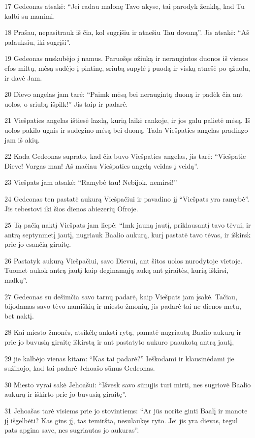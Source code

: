 \par 17 Gedeonas atsakė: “Jei radau malonę Tavo akyse, tai parodyk ženklą, kad Tu kalbi su manimi. 
\par 18 Prašau, nepasitrauk iš čia, kol sugrįšiu ir atnešiu Tau dovaną”. Jis atsakė: “Aš palauksiu, iki sugrįši”. 
\par 19 Gedeonas nuskubėjo į namus. Paruošęs ožiuką ir neraugintos duonos iš vienos efos miltų, mėsą sudėjo į pintinę, sriubą supylė į puodą ir viską atnešė po ąžuolu, ir davė Jam. 
\par 20 Dievo angelas jam tarė: “Paimk mėsą bei neraugintą duoną ir padėk čia ant uolos, o sriubą išpilk!” Jis taip ir padarė. 
\par 21 Viešpaties angelas ištiesė lazdą, kurią laikė rankoje, ir jos galu palietė mėsą. Iš uolos pakilo ugnis ir sudegino mėsą bei duoną. Tada Viešpaties angelas pradingo jam iš akių. 
\par 22 Kada Gedeonas suprato, kad čia buvo Viešpaties angelas, jis tarė: “Viešpatie Dieve! Vargas man! Aš mačiau Viešpaties angelą veidas į veidą”. 
\par 23 Viešpats jam atsakė: “Ramybė tau! Nebijok, nemirsi!” 
\par 24 Gedeonas ten pastatė aukurą Viešpačiui ir pavadino jį “Viešpats yra ramybė”. Jis tebestovi iki šios dienos abiezerių Ofroje. 
\par 25 Tą pačią naktį Viešpats jam liepė: “Imk jauną jautį, priklausantį tavo tėvui, ir antrą septynmetį jautį, nugriauk Baalio aukurą, kurį pastatė tavo tėvas, ir iškirsk prie jo esančią giraitę. 
\par 26 Pastatyk aukurą Viešpačiui, savo Dievui, ant šitos uolos nurodytoje vietoje. Tuomet aukok antrą jautį kaip deginamąją auką ant giraitės, kurią iškirsi, malkų”. 
\par 27 Gedeonas su dešimčia savo tarnų padarė, kaip Viešpats jam įsakė. Tačiau, bijodamas savo tėvo namiškių ir miesto žmonių, jis padarė tai ne dienos metu, bet naktį. 
\par 28 Kai miesto žmonės, atsikėlę anksti rytą, pamatė nugriautą Baalio aukurą ir prie jo buvusią giraitę iškirstą ir ant pastatyto aukuro paaukotą antrą jautį, 
\par 29 jie kalbėjo vienas kitam: “Kas tai padarė?” Ieškodami ir klausinėdami jie sužinojo, kad tai padarė Jehoašo sūnus Gedeonas. 
\par 30 Miesto vyrai sakė Jehoašui: “Išvesk savo sūnų­jis turi mirti, nes sugriovė Baalio aukurą ir iškirto prie jo buvusią giraitę”. 
\par 31 Jehoašas tarė visiems prie jo stovintiems: “Ar jūs norite ginti Baalį ir manote jį išgelbėti? Kas gins jį, tas temiršta, nesulaukęs ryto. Jei jis yra dievas, tegul pats apgina save, nes sugriautas jo aukuras”. 
